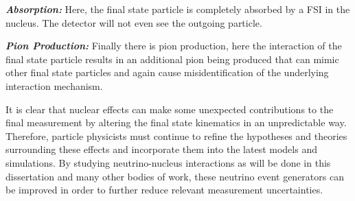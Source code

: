 \documentclass[11pt]{article}
\begin{document}
\noindent \textbf{\textit{Absorption: }}Here, the final state particle is completely absorbed by a FSI in the nucleus. The detector will not even see the outgoing particle.

\vspace{10pt}

\noindent \textbf{\textit{Pion Production: }}Finally there is pion production, here the interaction of the final state particle results in an additional pion being produced that can mimic other final state particles and again cause misidentification of the underlying interaction mechanism.

\vspace{10pt}

It is clear that nuclear effects can make some unexpected contributions to the final measurement by altering the final state kinematics in an unpredictable way. Therefore, particle physicists must continue to refine the hypotheses and theories surrounding these effects and incorporate them into the latest models and simulations. By studying neutrino-nucleus interactions as will be done in this dissertation and many other bodies of work, these neutrino event generators can be improved in order to further reduce relevant measurement uncertainties.
\end{document}
